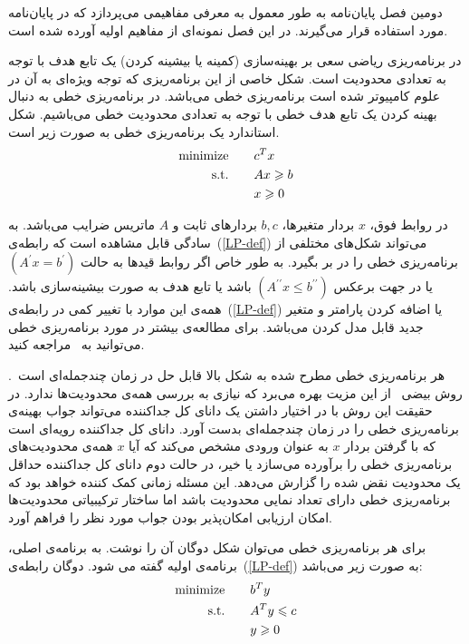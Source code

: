 

دومین فصل پایان‌نامه به طور معمول به معرفی مفاهیمی می‌پردازد که در پایان‌نامه مورد استفاده قرار می‌گیرند.
در این فصل نمونه‌ای از مفاهیم اولیه آورده شده است.



در برنامه‌ریزی‌ ریاضی سعی بر بهینه‌سازی (کمینه یا بیشینه کردن) یک تابع هدف با توجه به تعدادی محدودیت است. شکل خاصی از این برنامه‌ریزی که توجه ويژه‌ای به آن در علوم کامپیوتر شده است برنامه‌ریزی خطی می‌باشد. در برنامه‌ریزی خطی به دنبال بهینه کردن یک تابع هدف خطی با توجه به تعدادی محدودیت خطی می‌باشیم. شکل استاندارد یک برنامه‌ریزی خطی به صورت زیر است.
\begin{alignat}{3}
\text{minimize}   & \quad &&  c^T x       \label{LP-def}  \\
\text{s.t.}           & &&  Ax \geq b   \notag           \\
                       	& &&   x \geq 0     \notag 
\end{alignat}

در روابط فوق، $x$ بردار متغیرها،  $b, c$ بردارهای ثابت و $A$ ماتریس ضرایب می‌باشد. به سادگی قابل مشاهده است که رابطه‌ی~(\ref{LP-def}) می‌تواند شکل‌های مختلفی از برنامه‌ریزی خطی را در بر بگیرد. به طور خاص اگر روابط قید‌ها به حالت $(A^\prime x=b^ \prime)$ یا در جهت برعکس $(A^{\prime\prime} x \leq b^{\prime\prime} )$ باشد یا تابع هدف به صورت بیشینه‌سازی باشد. همه‌ی این موارد با تغییر کمی در رابطه‌ی~(\ref{LP-def}) یا اضافه کردن پارامتر و متغیر جدید قابل مدل کردن می‌باشد. برای مطالعه‌ی بیشتر در مورد برنامه‌ریزی خطی می‌توانید به~\cite{Sch86}  مراجعه کنید.

هر برنامه‌ریزی خطی مطرح شده به شکل بالا قابل حل در زمان چندجمله‌ای است~\cite{Kha79,Kar84}. روش بیضی~\cite{Kha79} از این مزیت بهره می‌برد که نیازی به بررسی همه‌ی محدودیت‌ها ندارد. در حقیقت این روش با در اختیار داشتن یک دانای کل جداکننده می‌تواند جواب بهینه‌ی برنامه‌ریزی خطی را در زمان چندجمله‌ای بدست آورد. دانای کل جداکننده رویه‌ای است که با گرفتن بردار $x$ به عنوان ورودی مشخص می‌کند که آیا $x$ همه‌ی محدودیت‌های برنامه‌ریزی خطی را برآورده می‌سازد یا خیر‌، در حالت دوم دانای کل جداکننده حداقل یک محدودیت نقض شده را گزارش می‌دهد. این مسئله زمانی کمک کننده خواهد بود که برنامه‌ریزی خطی دارای تعداد نمایی محدودیت باشد اما ساختار ترکیبیاتی محدودیت‌ها امکان ارزیابی امکان‌پذیر بودن جواب مورد نظر را فراهم آورد.

برای هر برنامه‌ریزی خطی می‌توان شکل دوگان آن را نوشت. به برنامه‌ی اصلی، برنامه‌ی اولیه گفته  می شود. دوگان رابطه‌ی~(\ref{LP-def}) به صورت زیر می‌باشد:
\begin{alignat}{3}
\text{minimize}   & \quad &&    b^T y           \label{DUAL-def}  \\
\text{s.t.}          &  &&    A^T y \leq c  \notag  \\
                       &  &&	y \geq 0        \notag 
\end{alignat}

